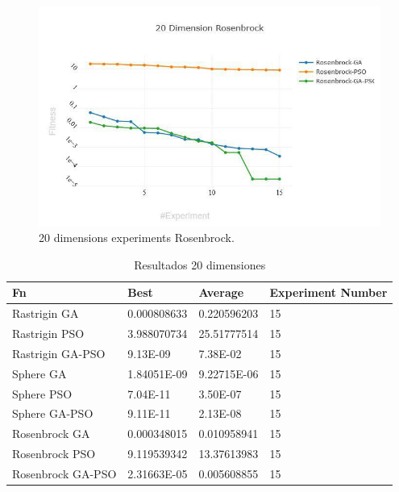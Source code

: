 \documentclass[runningheads]{llncs}
\begin{document}
                \begin{figure}[htp]
                  \includegraphics[width=\textwidth]{20-rosenbrock.jpg}
                  \caption{20 dimensions experiments Rosenbrock.} \label{fig1}
                  \end{figure}

                  \begin{table}[htp]

    \caption{Resultados 20 dimensiones}
    \label{table:resultados-2}
    \centering
    \begin{tabular}{|l|l|l|l|}
    \hline
    Fn & Best & Average & Experiment Number \\
    \hline
    \hline
    Rastrigin GA & 0.000808633 & 0.220596203 & 15\\
    \hline
    Rastrigin PSO & 3.988070734 & 25.51777514 & 15\\
    \hline
    Rastrigin GA-PSO & 9.13E-09 & 7.38E-02 & 15\\
    \hline
    Sphere GA & 1.84051E-09 & 9.22715E-06 & 15\\
    \hline
    Sphere PSO & 7.04E-11 & 3.50E-07 & 15\\
    \hline
    Sphere GA-PSO & 9.11E-11 & 2.13E-08 & 15\\
    \hline
    Rosenbrock GA & 0.000348015 & 0.010958941 & 15\\
    \hline
    Rosenbrock PSO & 9.119539342 & 13.37613983 & 15\\
    \hline
    Rosenbrock GA-PSO & 2.31663E-05 & 0.005608855 & 15\\
    \hline
    \end{tabular}
    \end{table}
\end{document}
